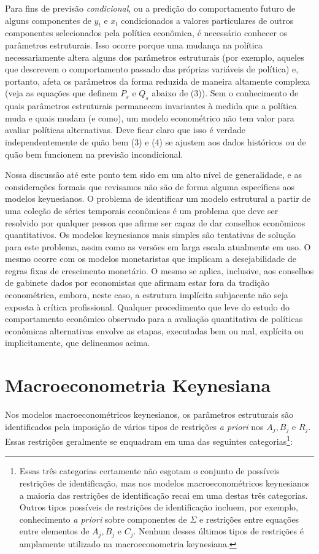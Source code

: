 \documentclass[12pt]{article}
\begin{document}
Para fins de previsão \textit{condicional}, ou a predição do comportamento futuro de alguns componentes de $y_t$ e $x_t$ condicionados a valores particulares de outros componentes selecionados pela política econômica, é necessário conhecer os parâmetros estruturais. Isso ocorre porque uma mudança na política necessariamente altera alguns dos parâmetros estruturais (por exemplo, aqueles que descrevem o comportamento passado das próprias variáveis de política) e, portanto, afeta os parâmetros da forma reduzida de maneira altamente complexa (veja as equações que definem $P_s$ e $Q_s$ abaixo de (3)). Sem o conhecimento de quais parâmetros estruturais permanecem invariantes à medida que a política muda e quais mudam (e como), um modelo econométrico não tem valor para avaliar políticas alternativas. Deve ficar claro que isso é verdade independentemente de quão bem (3) e (4) se ajustem aos dados históricos ou de quão bem funcionem na previsão incondicional.

Nossa discussão até este ponto tem sido em um alto nível de generalidade, e as considerações formais que revisamos não são de forma alguma específicas aos modelos keynesianos. O problema de identificar um modelo estrutural a partir de uma coleção de séries temporais econômicas é um problema que deve ser resolvido por qualquer pessoa que afirme ser capaz de dar conselhos econômicos quantitativos. Os modelos keynesianos mais simples são tentativas de solução para este problema, assim como as versões em larga escala atualmente em uso. O mesmo ocorre com os modelos monetaristas que implicam a desejabilidade de regras fixas de crescimento monetário. O mesmo se aplica, inclusive, aos conselhos de gabinete dados por economistas que afirmam estar fora da tradição econométrica, embora, neste caso, a estrutura implícita subjacente não seja exposta à crítica profissional. Qualquer procedimento que leve do estudo do comportamento econômico observado para a avaliação quantitativa de políticas econômicas alternativas envolve as etapas, executadas bem ou mal, explícita ou implicitamente, que delineamos acima.

\section{Macroeconometria Keynesiana}

Nos modelos macroeconométricos keynesianos, os parâmetros estruturais são identificados pela imposição de vários tipos de restrições \textit{a priori} nos $A_j, B_j$ e $R_j$. Essas restrições geralmente se enquadram em uma das seguintes categorias\footnote{Essas três categorias certamente não esgotam o conjunto de possíveis restrições de identificação, mas nos modelos macroeconométricos keynesianos a maioria das restrições de identificação recai em uma destas três categorias. Outros tipos possíveis de restrições de identificação incluem, por exemplo, conhecimento \textit{a priori} sobre componentes de $\Sigma$ e restrições entre equações entre elementos de $A_j, B_j$ e $C_j$. Nenhum desses últimos tipos de restrições é amplamente utilizado na macroeconometria keynesiana.}:
\end{document}
